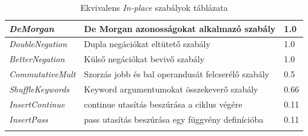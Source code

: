 \begin{center}
\begin{longtable}{ | p{} | p{} | p{} | }
		\emph{DeMorgan}
		& De Morgan azonosságokat alkalmazó szabály
		& 1.0
		\\ \hline

		\emph{DoubleNegation}
		& Dupla negációkat eltütető szabály
		& 1.0
		\\ \hline

		\emph{BetterNegation}
		& Külső negációkat bevivő szabály
		& 1.0
		\\ \hline

		\emph{CommutativeMult}
		& Szorzás jobb és bal operandusát felcserélő szabály
		& 0.5
		\\ \hline

		\emph{ShuffleKeywords}
		& Keyword argumentumokat összekeverő szabály
		& 0.66
		\\ \hline

		\emph{InsertContinue}
		& continue utasítás beszúrása a ciklus végére
		& 0.11
		\\ \hline

		\emph{InsertPass}
		& pass utasítás beszúrása egy függvény definícióba
		& 0.11
		\\ \hline

		\caption{Ekvivalens \emph{In-place} szabályok táblázata}
		\label{tab:in-place-rules-eqv}
	\end{longtable}
\end{center}

